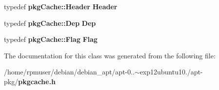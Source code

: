 \begin{DoxyCompactItemize}
\item 
typedef {\bf pkg\-Cache\-::\-Header} {\bfseries \-Header}\label{classpkgCache_1_1Namespace_a293d4384c0d1c9ee01c7d38d53f039ff}

\item 
typedef {\bf pkg\-Cache\-::\-Dep} {\bfseries \-Dep}\label{classpkgCache_1_1Namespace_a20e7224d7d01eb91ed0e976a8a7fadd8}

\item 
typedef {\bf pkg\-Cache\-::\-Flag} {\bfseries \-Flag}\label{classpkgCache_1_1Namespace_a420dd7f197a332128fe46458833d915a}

\end{DoxyCompactItemize}


\-The documentation for this class was generated from the following file\-:\begin{DoxyCompactItemize}
\item 
/home/rpmuser/debian/debian\-\_\-apt/apt-\/0..$\sim$exp12ubuntu10./apt-\/pkg/{\bf pkgcache.\-h}\end{DoxyCompactItemize}

